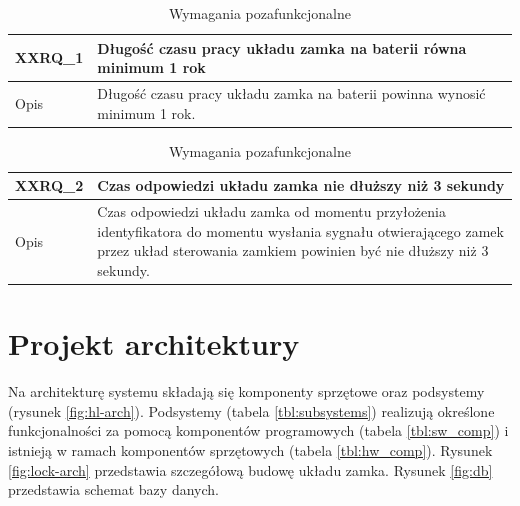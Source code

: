         \begin{table}[h!]
            \caption{Wymagania pozafunkcjonalne}
            \centering
            \begin{subtable}[c]{\textwidth}
                \centering
                \begin{tabular}{|p{2cm}|p{12cm}|}
                    \hline XXRQ\_1      & \textbf{Długość czasu pracy układu zamka na baterii równa minimum 1 rok}  \\
                    \hline \cellcolor[gray]{0.8} Opis         & Długość czasu pracy układu zamka na baterii powinna wynosić minimum 1 rok. \\
                    \hline
                \end{tabular}
                \label{tbl:xxrq1}
                \vspace{10mm}       
            \end{subtable}
        \quad%
            \begin{subtable}[c]{\textwidth}
                \centering
                \begin{tabular}{|p{2cm}|p{12cm}|}
                    \hline XXRQ\_2      & \textbf{Czas odpowiedzi układu zamka nie dłuższy niż 3 sekundy}  \\
                    \hline \cellcolor[gray]{0.8} Opis         & Czas odpowiedzi układu zamka od momentu przyłożenia identyfikatora do momentu wysłania sygnału otwierającego zamek przez układ sterowania zamkiem powinien być nie dłuższy niż 3 sekundy. \\
                    \hline
                \end{tabular}
                \label{tbl:xxrq2}    
            \end{subtable}
            \label{tbl:xxrq}
        \end{table}

    \vspace{10mm}

        \section{Projekt architektury}

            Na architekturę systemu składają się komponenty sprzętowe oraz podsystemy (rysunek \ref{fig:hl-arch}). Podsystemy (tabela \ref{tbl:subsystems}) realizują określone funkcjonalności za pomocą komponentów programowych (tabela \ref{tbl:sw_comp}) i istnieją w ramach komponentów sprzętowych (tabela \ref{tbl:hw_comp}). Rysunek \ref{fig:lock-arch} przedstawia szczegółową budowę układu zamka. Rysunek \ref{fig:db} przedstawia schemat bazy danych.

